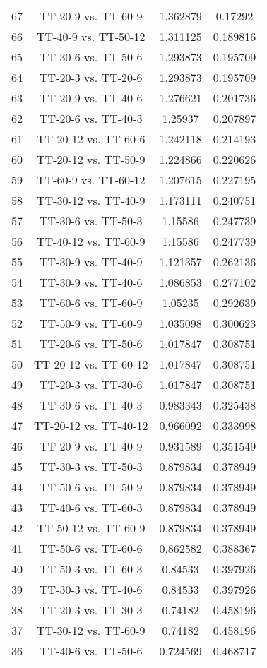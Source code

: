 \documentclass[a4paper,10pt]{article}
\begin{document}
\begin{landscape}
\begin{table}[!htp]
\begin{tabular}{cccc}
67&TT-20-9 vs. TT-60-9&1.362879&0.17292\\
66&TT-40-9 vs. TT-50-12&1.311125&0.189816\\
65&TT-30-6 vs. TT-50-6&1.293873&0.195709\\
64&TT-20-3 vs. TT-20-6&1.293873&0.195709\\
63&TT-20-9 vs. TT-40-6&1.276621&0.201736\\
62&TT-20-6 vs. TT-40-3&1.25937&0.207897\\
61&TT-20-12 vs. TT-60-6&1.242118&0.214193\\
60&TT-20-12 vs. TT-50-9&1.224866&0.220626\\
59&TT-60-9 vs. TT-60-12&1.207615&0.227195\\
58&TT-30-12 vs. TT-40-9&1.173111&0.240751\\
57&TT-30-6 vs. TT-50-3&1.15586&0.247739\\
56&TT-40-12 vs. TT-60-9&1.15586&0.247739\\
55&TT-30-9 vs. TT-40-9&1.121357&0.262136\\
54&TT-30-9 vs. TT-40-6&1.086853&0.277102\\
53&TT-60-6 vs. TT-60-9&1.05235&0.292639\\
52&TT-50-9 vs. TT-60-9&1.035098&0.300623\\
51&TT-20-6 vs. TT-50-6&1.017847&0.308751\\
50&TT-20-12 vs. TT-60-12&1.017847&0.308751\\
49&TT-20-3 vs. TT-30-6&1.017847&0.308751\\
48&TT-30-6 vs. TT-40-3&0.983343&0.325438\\
47&TT-20-12 vs. TT-40-12&0.966092&0.333998\\
46&TT-20-9 vs. TT-40-9&0.931589&0.351549\\
45&TT-30-3 vs. TT-50-3&0.879834&0.378949\\
44&TT-50-6 vs. TT-50-9&0.879834&0.378949\\
43&TT-40-6 vs. TT-60-3&0.879834&0.378949\\
42&TT-50-12 vs. TT-60-9&0.879834&0.378949\\
41&TT-50-6 vs. TT-60-6&0.862582&0.388367\\
40&TT-50-3 vs. TT-60-3&0.84533&0.397926\\
39&TT-30-3 vs. TT-40-6&0.84533&0.397926\\
38&TT-20-3 vs. TT-30-3&0.74182&0.458196\\
37&TT-30-12 vs. TT-60-9&0.74182&0.458196\\
36&TT-40-6 vs. TT-50-6&0.724569&0.468717\\

\end{tabular}
\end{table}
\end{landscape}
\end{document}
